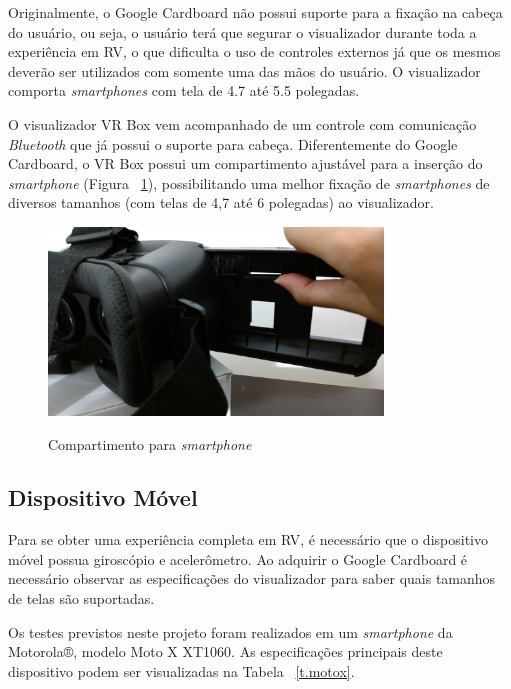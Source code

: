 Originalmente, o Google Cardboard não possui suporte para a fixação na cabeça do usuário, ou seja, o usuário terá que segurar o visualizador durante toda a experiência em RV, o que dificulta o uso de controles externos já que os mesmos deverão ser utilizados com somente uma das mãos do usuário. O visualizador comporta \textit{smartphones} com tela de 4.7 até 5.5 polegadas.

O visualizador VR Box vem acompanhado de um controle com comunicação \textit{Bluetooth} que já possui o suporte para cabeça. Diferentemente do Google Cardboard, o VR Box possui um compartimento ajustável para a inserção do \textit{smartphone} (Figura ~\ref{f.extensor}), possibilitando uma melhor fixação de \textit{smartphones} de diversos tamanhos (com telas de 4,7 até 6 polegadas) ao visualizador.

\begin{figure}[H]
	\caption{\small Compartimento para \textit{smartphone}}
	\centering
	\includegraphics[height=5cm]{Imagens/extensor.jpg}
	\label{f.extensor}
\end{figure}



\subsection{Dispositivo Móvel}
\label{s.dispositivomovel}

Para se obter uma experiência completa em RV, é necessário que o dispositivo móvel possua giroscópio e acelerômetro. Ao adquirir o Google Cardboard é necessário observar as especificações do visualizador para saber quais tamanhos de telas são suportadas. 

Os testes previstos neste projeto foram realizados em um \textit{smartphone} da Motorola®, modelo Moto X XT1060. As especificações principais deste dispositivo podem ser visualizadas na Tabela ~\ref{t.motox}.

